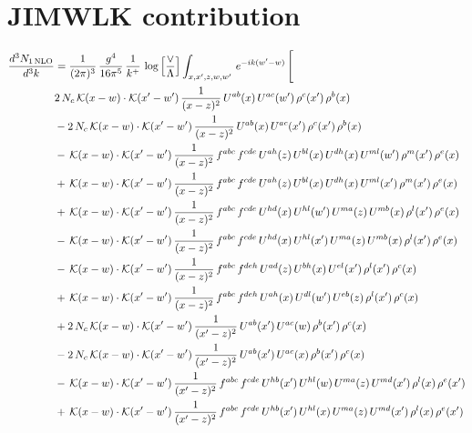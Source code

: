 \documentclass[9pt]{article}
\numberwithin{equation}{section}
\begin{document}
\section{JIMWLK contribution}
\begin{align}
\frac{d^{3}N_{1\,\mathrm{NLO}}}{d^{3}k} & = \frac{1}{(2\pi)^{3}}\,\frac{g^{4}}{16\pi^{5}}\,\frac{1}{k^{+}}\,\log\Big[\frac{\vee}{\Lambda}\Big]\int_{x,x',z,w,w'}\,e^{-ik(w'-w)}\,\Bigg[\notag\\
&2\,N_{c}\,\mathcal{K}(x-w)\cdot\mathcal{K}(x'-w')\,\frac{1}{(x-z)^{2}}\,U^{ab}(x)\,U^{ac}(w')\,\rho^{c}(x')\,\rho^{b}(x)\notag\\
&-2\,N_{c}\,\mathcal{K}(x-w)\cdot\mathcal{K}(x'-w')\,\frac{1}{(x-z)^{2}}\,U^{ab}(x)\,U^{ac}(x')\,\rho^{c}(x')\,\rho^{b}(x)\notag\\
&-\,\mathcal{K}(x-w)\cdot\mathcal{K}(x'-w')\,\frac{1}{(x-z)^{2}}\,f^{abc}\,f^{cde}\,U^{ah}(z)\,U^{bl}(x)\,U^{dh}(x)\,U^{ml}(w')\,\rho^{m}(x')\,\rho^{e}(x)\notag\\
&+\,\mathcal{K}(x-w)\cdot\mathcal{K}(x'-w')\,\frac{1}{(x-z)^{2}}\,f^{abc}\,f^{cde}\,U^{ah}(z)\,U^{bl}(x)\,U^{dh}(x)\,U^{ml}(x')\,\rho^{m}(x')\,\rho^{e}(x)\notag\\
&+\,\mathcal{K}(x-w)\cdot\mathcal{K}(x'-w')\,\frac{1}{(x-z)^{2}}\,f^{abc}\,f^{cde}\,U^{hd}(x)\,U^{hl}(w')\,U^{ma}(z)\,U^{mb}(x)\,\rho^{l}(x')\,\rho^{e}(x)\notag\\
&-\,\mathcal{K}(x-w)\cdot\mathcal{K}(x'-w')\,\frac{1}{(x-z)^{2}}\,f^{abc}\,f^{cde}\,U^{hd}(x)\,U^{hl}(x')\,U^{ma}(z)\,U^{mb}(x)\,\rho^{l}(x')\,\rho^{e}(x)\notag\\
&-\,\mathcal{K}(x-w)\cdot\mathcal{K}(x'-w')\,\frac{1}{(x-z)^{2}}\,f^{abc}\,f^{deh}\,U^{ad}(z)\,U^{bh}(x)\,U^{el}(x')\,\rho^{l}(x')\,\rho^{c}(x)\notag\\
&+\,\mathcal{K}(x-w)\cdot\mathcal{K}(x'-w')\,\frac{1}{(x-z)^{2}}\,f^{abc}\,f^{deh}\,U^{ah}(x)\,U^{dl}(w')\,U^{eb}(z)\,\rho^{l}(x')\,\rho^{c}(x)\notag\\
&+2\,N_{c}\,\mathcal{K}(x-w)\cdot\mathcal{K}(x'-w')\,\frac{1}{(x'-z)^{2}}\,U^{ab}(x')\,U^{ac}(w)\,\rho^{b}(x')\,\rho^{c}(x)\notag\\
&-2\,N_{c}\,\mathcal{K}(x-w)\cdot\mathcal{K}(x'-w')\,\frac{1}{(x'-z)^{2}}\,U^{ab}(x')\,U^{ac}(x)\,\rho^{b}(x')\,\rho^{c}(x)\notag\\
&-\,\mathcal{K}(x-w)\cdot\mathcal{K}(x'-w')\,\frac{1}{(x'-z)^{2}}\,f^{abc}\,f^{cde}\,U^{hb}(x')\,U^{hl}(w)\,U^{ma}(z)\,U^{md}(x')\,\rho^{l}(x)\,\rho^{e}(x')\notag\\
&+\,\mathcal{K}(x-w)\cdot\mathcal{K}(x'-w')\,\frac{1}{(x'-z)^{2}}\,f^{abc}\,f^{cde}\,U^{hb}(x')\,U^{hl}(x)\,U^{ma}(z)\,U^{md}(x')\,\rho^{l}(x)\,\rho^{e}(x')\notag\\

\end{align}
\end{document}
